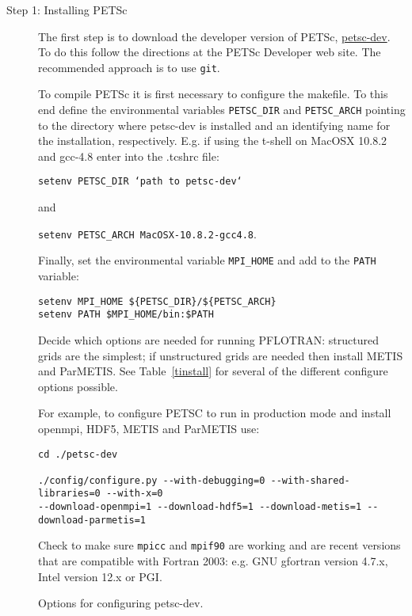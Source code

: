 \begin{description}
\item[Step 1: Installing PETSc] The first step is to download the developer version of PETSc, \href{http://www.mcs.anl.gov/petsc/developers/index.html}{petsc-dev}. To do this follow the directions at the PETSc Developer web site. The recommended approach is to use {\tt git}.

To compile PETSc it is first necessary to configure the makefile. To this end define the environmental variables {\footnotesize\tt PETSC\_DIR} and {\footnotesize\tt PETSC\_ARCH} pointing to the directory where petsc-dev is installed and an identifying name for the installation, respectively. E.g. if using the t-shell on MacOSX 10.8.2 and gcc-4.8 enter into the .tcshrc file:

{\footnotesize\tt setenv PETSC\_DIR `path to petsc-dev`}

and

{\footnotesize\tt setenv PETSC\_ARCH MacOSX-10.8.2-gcc4.8}.

Finally, set the environmental variable {\footnotesize\tt MPI\_HOME} and add to the {\footnotesize\tt PATH} variable:
\footnotesize
\begin{Verbatim}
setenv MPI_HOME ${PETSC_DIR}/${PETSC_ARCH}
setenv PATH $MPI_HOME/bin:$PATH
\end{Verbatim}
\normalsize
Decide which options are needed for running PFLOTRAN: structured grids are the simplest; if unstructured grids are needed then install METIS and ParMETIS. See Table~\ref{tinstall} for several of the different configure options possible.

For example, to configure PETSC to run in production mode and install openmpi, HDF5, METIS and ParMETIS use:
\footnotesize
\begin{Verbatim}
cd ./petsc-dev

./config/configure.py --with-debugging=0 --with-shared-libraries=0 --with-x=0 
--download-openmpi=1 --download-hdf5=1 --download-metis=1 --download-parmetis=1
\end{Verbatim}
\normalsize

\noindent
Check to make sure {\footnotesize\tt mpicc} and {\footnotesize\tt mpif90} are working and are recent versions that are compatible with Fortran 2003: e.g. GNU gfortran version 4.7.x, Intel version 12.x or PGI.

\begin{table}[H]\centering
\caption{Options for configuring petsc-dev.}
\label{tinstall}


\end{table}
\end{description}
